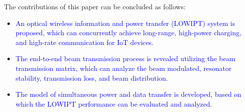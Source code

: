 \documentclass{IEEEtran}
\begin{document}
The contributions of this paper can be concluded as follows:
\begin{itemize}
	\item \textcolor{blue}{
	An optical wireless information and power transfer (LOWIPT) system is proposed, which can concurrently achieve long-range, high-power charging, and high-rate communication for IoT devices.
	}%
	\item \textcolor{blue}{The end-to-end beam transmission process is revealed utilizing the beam transmission matrix, which can analyze the beam modulated, resonator stability, transmission loss, and beam distribution.}
	\item \textcolor{blue}{
	The model of simultaneous power and data transfer is developed, based on which the LOWIPT performance can be evaluated and analyzed.
	}
	

\end{itemize}
\end{document}
